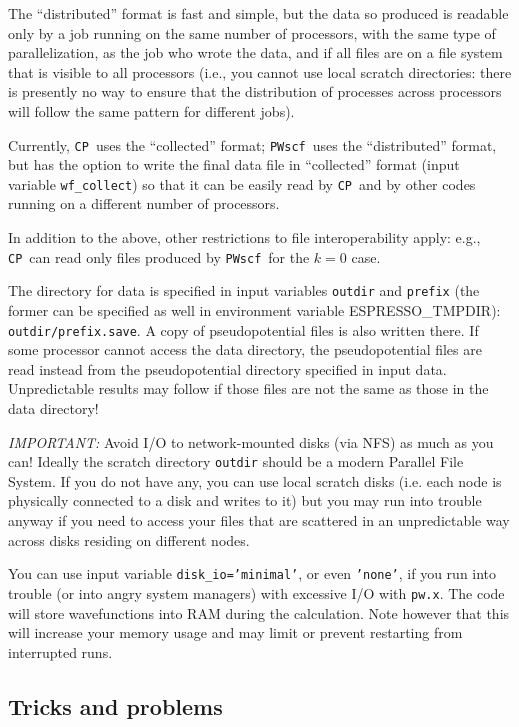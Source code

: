 \documentclass[12pt,a4paper]{article}
\def\pwx{\texttt{pw.x}}
\def\PWscf{\texttt{PWscf}}
\def\CP{\texttt{CP}}
\begin{document}
The ``distributed'' format is fast and simple,
but the data so produced is readable only by 
a job running on the same number of processors,
with the same type of parallelization, as the
job who wrote the data, and if all 
files are on a file system that is visible to all
processors (i.e., you cannot use local scratch
directories: there is presently no way to ensure 
that the distribution of processes across
processors will follow the same pattern 
for different jobs). 

Currently, \CP\ uses the ``collected'' format;
\PWscf\ uses the ``distributed'' format, but 
has the option to write the final data file in 
``collected'' format (input variable \texttt{wf\_collect})
so that it can be easily read by \CP\ and by other
codes running on a different  number of processors.

In addition to the above, other restrictions to file
interoperability apply: e.g., \CP\ can read only files
produced by \PWscf\ for the $k=0$ case. 

The directory for data is specified in input variables
\texttt{outdir} and \texttt{prefix} (the former can be specified
as well in environment variable ESPRESSO\_TMPDIR):
\texttt{outdir/prefix.save}. A copy of pseudopotential files
is also written there. If some processor cannot access the
data directory, the pseudopotential files are read instead
from the pseudopotential directory specified in input data.
Unpredictable results may follow if those files
are not the same as those in the data directory!

{\em IMPORTANT:}
Avoid I/O to network-mounted disks (via NFS) as much as you can! 
Ideally the scratch directory \texttt{outdir} should be a modern 
Parallel File System. If you do not have any, you can use local
scratch disks (i.e. each node is physically connected to a disk
and writes to it) but you may run into trouble anyway if you 
need to access your files that are scattered in an unpredictable
way across disks residing on different nodes.

You can use input variable \texttt{disk\_io='minimal'}, or even 
\texttt{'none'}, if you run
into trouble (or into angry system managers) with excessive I/O with \pwx. 
The code will store wavefunctions into RAM during the calculation.
Note however that this will increase your memory usage and may limit 
or prevent restarting from interrupted runs.

\subsection{Tricks and problems}
\end{document}
